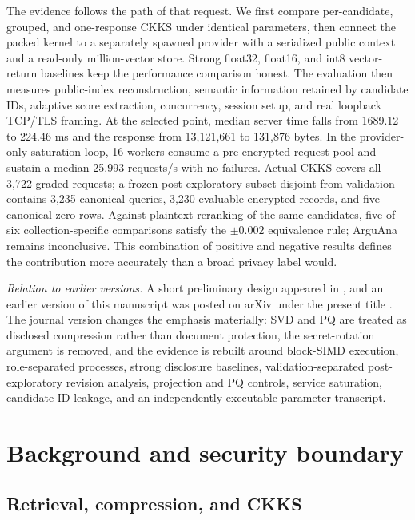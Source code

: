 \documentclass[pdflatex,sn-basic,Numbered]{sn-jnl}
\theoremstyle{plain}
\begin{document}
The evidence follows the path of that request. We first compare per-candidate, grouped, and one-response CKKS under identical parameters, then connect the packed kernel to a separately spawned provider with a serialized public context and a read-only million-vector store. Strong float32, float16, and int8 vector-return baselines keep the performance comparison honest. The evaluation then measures public-index reconstruction, semantic information retained by candidate IDs, adaptive score extraction, concurrency, session setup, and real loopback TCP/TLS framing. At the selected point, median server time falls from 1689.12 to 224.46 ms and the response from 13,121,661 to 131,876 bytes. In the provider-only saturation loop, 16 workers consume a pre-encrypted request pool and sustain a median 25.993 requests/s with no failures. Actual CKKS covers all 3,722 graded requests; a frozen post-exploratory subset disjoint from validation contains 3,235 canonical queries, 3,230 evaluable encrypted records, and five canonical zero rows. Against plaintext reranking of the same candidates, five of six collection-specific comparisons satisfy the $\pm0.002$ equivalence rule; ArguAna remains inconclusive. This combination of positive and negative results defines the contribution more accurately than a broad privacy label would.

\noindent\textit{Relation to earlier versions.} A short preliminary design appeared in \cite{Kurilenko2026Preliminary}, and an earlier version of this manuscript was posted on arXiv under the present title \cite{Kurilenko2026Arxiv}. The journal version changes the emphasis materially: SVD and PQ are treated as disclosed compression rather than document protection, the secret-rotation argument is removed, and the evidence is rebuilt around block-SIMD execution, role-separated processes, strong disclosure baselines, validation-separated post-exploratory revision analysis, projection and PQ controls, service saturation, candidate-ID leakage, and an independently executable parameter transcript.

\section{Background and security boundary}\label{sec:background}

\subsection{Retrieval, compression, and CKKS}\label{subsec:dense-pq}
\end{document}
